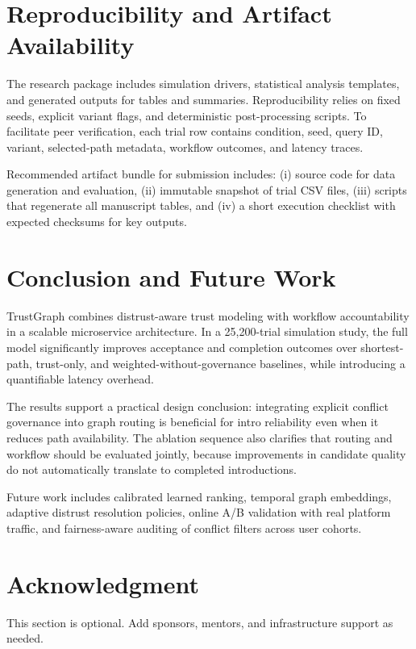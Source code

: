 \documentclass[conference]{IEEEtran}
\begin{document}
\section{Reproducibility and Artifact Availability}
The research package includes simulation drivers, statistical analysis templates, and generated outputs for tables and summaries. Reproducibility relies on fixed seeds, explicit variant flags, and deterministic post-processing scripts. To facilitate peer verification, each trial row contains condition, seed, query ID, variant, selected-path metadata, workflow outcomes, and latency traces.

Recommended artifact bundle for submission includes: (i) source code for data generation and evaluation, (ii) immutable snapshot of trial CSV files, (iii) scripts that regenerate all manuscript tables, and (iv) a short execution checklist with expected checksums for key outputs.

\section{Conclusion and Future Work}
TrustGraph combines distrust-aware trust modeling with workflow accountability in a scalable microservice architecture. In a 25,200-trial simulation study, the full model significantly improves acceptance and completion outcomes over shortest-path, trust-only, and weighted-without-governance baselines, while introducing a quantifiable latency overhead.

The results support a practical design conclusion: integrating explicit conflict governance into graph routing is beneficial for intro reliability even when it reduces path availability. The ablation sequence also clarifies that routing and workflow should be evaluated jointly, because improvements in candidate quality do not automatically translate to completed introductions.

Future work includes calibrated learned ranking, temporal graph embeddings, adaptive distrust resolution policies, online A/B validation with real platform traffic, and fairness-aware auditing of conflict filters across user cohorts.

\section*{Acknowledgment}
This section is optional. Add sponsors, mentors, and infrastructure support as needed.



\end{document}
